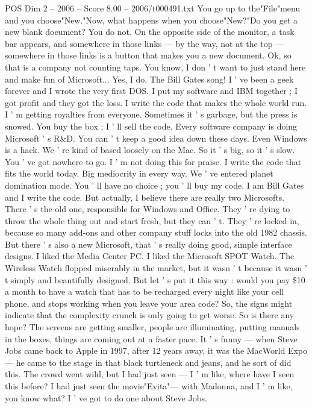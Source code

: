 \begin{textsample}{POS Dim 2 – 2006 – Score 8.00 – 2006/t000491.txt}
You go up to the"File"menu and you choose"New."Now, what happens when you choose"New?"Do you get a new blank document?
You do not.
On the opposite side of the monitor, a task bar appears, and somewhere in those links — by the way, not at the top — somewhere in those links is a button that makes you a new document.
Ok, so that is a company not counting taps.
You know, I don ' t want to just stand here and make fun of Microsoft...
Yes, I do.
The Bill Gates song!
I ' ve been a geek forever and I wrote the very first DOS.
I put my software and IBM together ; I got profit and they got the loss.
I write the code that makes the whole world run.
I ' m getting royalties from everyone.
Sometimes it ' s garbage, but the press is snowed.
You buy the box ; I ' ll sell the code.
Every software company is doing Microsoft ' s R\&D.
You can ' t keep a good idea down these days.
Even Windows is a hack.
We ' re kind of based loosely on the Mac.
So it ' s big, so it ' s slow.
You ' ve got nowhere to go.
I ' m not doing this for praise.
I write the code that fits the world today.
Big mediocrity in every way.
We ' ve entered planet domination mode.
You ' ll have no choice ; you ' ll buy my code.
I am Bill Gates and I write the code.
But actually, I believe there are really two Microsofts.
There ' s the old one, responsible for Windows and Office.
They ' re dying to throw the whole thing out and start fresh, but they can ' t.
They ' re locked in, because so many add-ons and other company stuff locks into the old 1982 chassis.
But there ' s also a new Microsoft, that ' s really doing good, simple interface designs.
I liked the Media Center PC.
I liked the Microsoft SPOT Watch.
The Wireless Watch flopped miserably in the market, but it wasn ' t because it wasn ' t simply and beautifully designed.
But let ' s put it this way : would you pay \$10 a month to have a watch that has to be recharged every night like your cell phone, and stops working when you leave your area code?
So, the signs might indicate that the complexity crunch is only going to get worse.
So is there any hope?
The screens are getting smaller, people are illuminating, putting manuals in the boxes, things are coming out at a faster pace.
It ' s funny — when Steve Jobs came back to Apple in 1997, after 12 years away, it was the MacWorld Expo — he came to the stage in that black turtleneck and jeans, and he sort of did this.
The crowd went wild, but I had just seen — I ' m like, where have I seen this before?
I had just seen the movie"Evita"— with Madonna, and I ' m like, you know what?
I ' ve got to do one about Steve Jobs.

\end{textsample}

